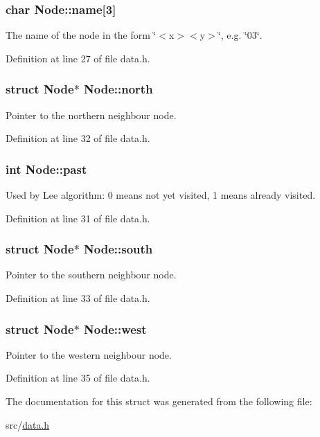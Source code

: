 \hypertarget{struct_node_ab4e4d331c9072f9a2fdc03f884ae954b}{
\subsubsection[{name}]{\setlength{\rightskip}{0pt plus 5cm}char Node\+::name\mbox{[}3\mbox{]}}}\label{struct_node_ab4e4d331c9072f9a2fdc03f884ae954b}
The name of the node in the form \char`\"{}$<$x$>$$<$y$>$\char`\"{}, e.\+g. \char`\"{}03\char`\"{}. 

Definition at line 27 of file data.\+h.

\hypertarget{struct_node_a5c53c4333e0171987ee7c9e81acfbf84}{
\subsubsection[{north}]{\setlength{\rightskip}{0pt plus 5cm}struct {\bf Node}$\ast$ Node\+::north}}\label{struct_node_a5c53c4333e0171987ee7c9e81acfbf84}
Pointer to the northern neighbour node. 

Definition at line 32 of file data.\+h.

\hypertarget{struct_node_af41636b8efb982766af9f70e64354936}{
\subsubsection[{past}]{\setlength{\rightskip}{0pt plus 5cm}int Node\+::past}}\label{struct_node_af41636b8efb982766af9f70e64354936}
Used by Lee algorithm\+: 0 means not yet visited, 1 means already visited. 

Definition at line 31 of file data.\+h.

\hypertarget{struct_node_a8426d2b108235be14c915efa87150614}{
\subsubsection[{south}]{\setlength{\rightskip}{0pt plus 5cm}struct {\bf Node}$\ast$ Node\+::south}}\label{struct_node_a8426d2b108235be14c915efa87150614}
Pointer to the southern neighbour node. 

Definition at line 33 of file data.\+h.

\hypertarget{struct_node_a9fd57a8641209ce5e3d0b93d63874f4c}{
\subsubsection[{west}]{\setlength{\rightskip}{0pt plus 5cm}struct {\bf Node}$\ast$ Node\+::west}}\label{struct_node_a9fd57a8641209ce5e3d0b93d63874f4c}
Pointer to the western neighbour node. 

Definition at line 35 of file data.\+h.



The documentation for this struct was generated from the following file\+:\begin{DoxyCompactItemize}
\item 
src/\hyperlink{data_8h}{data.\+h}\end{DoxyCompactItemize}
